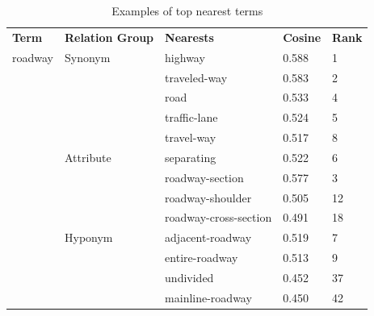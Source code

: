 \documentclass[Journal, InsideFigs, DoubleSpace]{ascelike} %
\begin{document}
%

%
\begin{table} [t]
	\caption{Examples of top nearest terms}
	\label{table:term_clustering}
	\centering
	\small
	\renewcommand{\arraystretch}{1.25}
	\begin{tabular}{l l l l l}
		\hline
		\textbf{Term}	&\textbf{Relation Group}	& \textbf{Nearests} & \textbf{Cosine} & \textbf{Rank}\\
		roadway			&Synonym					& highway & 0.588 & 1\\
		&							& traveled-way & 0.583 & 2\\
		&							& road & 0.533 & 4\\						
		&							& traffic-lane & 0.524 &5\\ 						
		&							& travel-way & 0.517 & 8\\  \cmidrule{2-5}
		&Attribute					& separating & 0.522 &6\\
		&							& roadway-section & 0.577 & 3\\						
		&							& roadway-shoulder & 0.505 & 12\\
		&							& roadway-cross-section & 0.491 & 18\\\cmidrule{2-5}						
		&Hyponym					& adjacent-roadway & 0.519 & 7\\
		&							& entire-roadway & 0.513 & 9\\
		&							& undivided & 0.452 & 37\\
		&							& mainline-roadway & 0.450 & 42\\
		\hline
	\end{tabular}
	\normalsize
\end{table}
\end{document}
